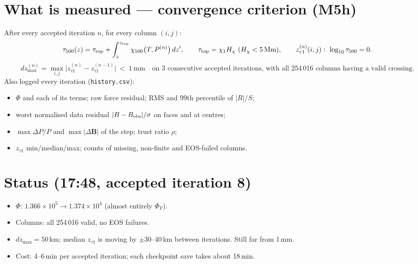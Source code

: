 \documentclass[9pt]{extarticle}
\begin{document}
\section{What is measured --- convergence criterion (M5h)}
After every accepted iteration $n$, for every column $(i,j)$:
\[
\tau_{500}(z)=\tau_{\rm top}+\int_z^{z_{\rm top}}\chi_{500}\big(T,P^{(n)}\big)\,dz',\qquad \tau_{\rm top}=\chi_1H_\chi\ (H_\chi<5\,\text{Mm}),\qquad z^{(n)}_{\tau1}(i,j):\ \log_{10}\tau_{500}=0 .
\]
\[
dz_{\max}^{(n)}=\max_{i,j}\big|z^{(n)}_{\tau1}-z^{(n-1)}_{\tau1}\big|\ <\ 1\ \text{mm}\quad\text{on 3 consecutive accepted iterations, with all } 254\,016 \text{ columns having a valid crossing.}
\]
Also logged every iteration (\texttt{history.csv}):
\begin{itemize}
\item $\Phi$ and each of its terms; raw force residual; RMS and 99th percentile of $|R|/S$;
\item worst normalised data residual $|B-B_{\rm obs}|/\sigma$ on faces and at centres;
\item $\max\Delta P/P$ and $\max|\Delta\mathbf B|$ of the step; trust ratio $\rho$;
\item $z_{\tau1}$ min/median/max; counts of missing, non-finite and EOS-failed columns.
\end{itemize}

\section{Status (17:48, accepted iteration 8)}
\begin{itemize}
\item $\Phi$: $1.366\times10^{5}\to1.374\times10^{4}$ (almost entirely $\Phi_F$).
\item Columns: all 254\,016 valid, no EOS failures.
\item $dz_{\max}=50$\,km; median $z_{\tau1}$ is moving by $\pm30$--$40$\,km between iterations. Still far from 1\,mm.
\item Cost: 4--6\,min per accepted iteration; each checkpoint save takes about 18\,min.
\end{itemize}
\end{document}
